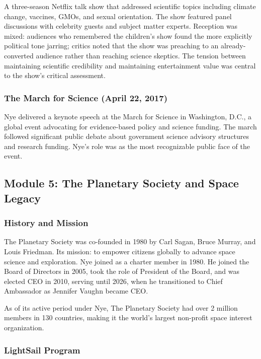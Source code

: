 \documentclass[11pt,letterpaper]{article}
\begin{document}
A three-season Netflix talk show that addressed scientific topics including climate change, vaccines, GMOs, and sexual orientation. The show featured panel discussions with celebrity guests and subject matter experts. Reception was mixed: audiences who remembered the children's show found the more explicitly political tone jarring; critics noted that the show was preaching to an already-converted audience rather than reaching science skeptics. The tension between maintaining scientific credibility and maintaining entertainment value was central to the show's critical assessment.

\subsubsection{The March for Science (April 22, 2017)}

Nye delivered a keynote speech at the March for Science in Washington, D.C., a global event advocating for evidence-based policy and science funding. The march followed significant public debate about government science advisory structures and research funding. Nye's role was as the most recognizable public face of the event.

\subsection{Module 5: The Planetary Society and Space Legacy}

\subsubsection{History and Mission}

The Planetary Society was co-founded in 1980 by Carl Sagan, Bruce Murray, and Louis Friedman. Its mission: to empower citizens globally to advance space science and exploration. Nye joined as a charter member in 1980. He joined the Board of Directors in 2005, took the role of President of the Board, and was elected CEO in 2010, serving until 2026, when he transitioned to Chief Ambassador as Jennifer Vaughn became CEO.

As of its active period under Nye, The Planetary Society had over 2 million members in 130 countries, making it the world's largest non-profit space interest organization.

\subsubsection{LightSail Program}
\end{document}
